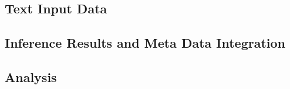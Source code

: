 \subsection{Text Input Data}

\subsection{Inference Results and Meta Data Integration}

\subsection{Analysis}
